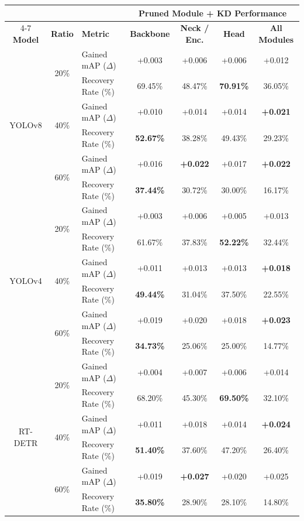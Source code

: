 \begin{tabular}{cclcccc}
\toprule
& & & \multicolumn{4}{c}{\textbf{Pruned Module + KD Performance}} \\
\cmidrule(lr){4-7}
\textbf{Model} & \textbf{Ratio} & \textbf{Metric} & \textbf{Backbone} & \textbf{Neck / Enc.} & \textbf{Head} & \textbf{All Modules} \\
\midrule

\multirow{6}{*}{YOLOv8 \cite{yolov8}} 
& \multirow{2}{*}{20\%} 
& Gained mAP ($\Delta$) & +0.003 & +0.006 & +0.006 & +0.012 \\
& & Recovery Rate (\%)    & 69.45\% & 48.47\% & \textbf{70.91\%} & 36.05\% \\
\cmidrule(lr){2-7}
& \multirow{2}{*}{40\%} 
& Gained mAP ($\Delta$) & +0.010 & +0.014 & +0.014 & \textbf{+0.021} \\
& & Recovery Rate (\%)    & \textbf{52.67\%} & 38.28\% & 49.43\% & 29.23\% \\
\cmidrule(lr){2-7}
& \multirow{2}{*}{60\%} 
& Gained mAP ($\Delta$) & +0.016 & \textbf{+0.022} & +0.017 & \textbf{+0.022} \\
& & Recovery Rate (\%)    & \textbf{37.44\%} & 30.72\% & 30.00\% & 16.17\% \\
\midrule

\multirow{6}{*}{YOLOv4 \cite{Bochkovskiy2020YOLOv4}} 
& \multirow{2}{*}{20\%} 
& Gained mAP ($\Delta$) & +0.003 & +0.006 & +0.005 & +0.013 \\
& & Recovery Rate (\%)    & 61.67\% & 37.83\% & \textbf{52.22\%} & 32.44\% \\
\cmidrule(lr){2-7}
& \multirow{2}{*}{40\%} 
& Gained mAP ($\Delta$) & +0.011 & +0.013 & +0.013 & \textbf{+0.018} \\
& & Recovery Rate (\%)    & \textbf{49.44\%} & 31.04\% & 37.50\% & 22.55\% \\
\cmidrule(lr){2-7}
& \multirow{2}{*}{60\%} 
& Gained mAP ($\Delta$) & +0.019 & +0.020 & +0.018 & \textbf{+0.023} \\
& & Recovery Rate (\%)    & \textbf{34.73\%} & 25.06\% & 25.00\% & 14.77\% \\
\midrule

\multirow{6}{*}{RT-DETR \cite{Zhao2023RTDETR}} 
& \multirow{2}{*}{20\%} 
& Gained mAP ($\Delta$) & +0.004 & +0.007 & +0.006 & +0.014 \\
& & Recovery Rate (\%)    & 68.20\% & 45.30\% & \textbf{69.50\%} & 32.10\% \\
\cmidrule(lr){2-7}
& \multirow{2}{*}{40\%} 
& Gained mAP ($\Delta$) & +0.011 & +0.018 & +0.014 & \textbf{+0.024} \\
& & Recovery Rate (\%)    & \textbf{51.40\%} & 37.60\% & 47.20\% & 26.40\% \\
\cmidrule(lr){2-7}
& \multirow{2}{*}{60\%} 
& Gained mAP ($\Delta$) & +0.019 & \textbf{+0.027} & +0.020 & +0.025 \\
& & Recovery Rate (\%)    & \textbf{35.80\%} & 28.90\% & 28.10\% & 14.80\% \\
\bottomrule
\end{tabular}
